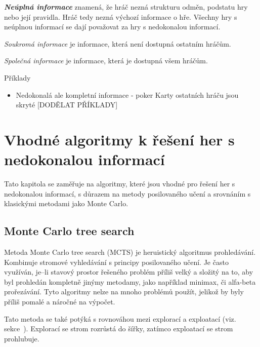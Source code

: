 \textbf{\emph{Neúplná informace}} znamená, že hráč nezná strukturu odměn, podstatu hry nebo její pravidla.
Hráč tedy nezná výchozí informace o hře.
Všechny hry s neúplnou informací se dají považovat za hry s nedokonalou informací.

\emph{Soukromá informace} je informace, která není dostupná ostatním hráčům.

\emph{Společná informace} je informace, která je dostupná všem hráčům.

Příklady
\begin{itemize}
  \item Nedokonalá ale kompletní informace - poker
    Karty ostatních hráču jsou skryté
    {\color {red} [DODĚLAT PŘÍKLADY]}


\end{itemize}


\section{Vhodné algoritmy k řešení her s nedokonalou informací}\label{sec:vhodne-algoritmy-k-reseni-her-s-nedokonalou-informaci}

Tato kapitola se zaměřuje na algoritmy, které jsou vhodné pro řešení her s nedokonalou informací, s důrazem na metody posilovaného učení a srovnáním s klasickými metodami jako Monte Carlo.

\subsection{Monte Carlo tree search}\label{subsec:monte-carlo-tree-search}
Metoda Monte Carlo tree search (MCTS) je heruistický algoritmus prohledávání.
Kombinuje stromové vyhledávání s principy posilovaného učení.
Je často využíván, je--li stavový prostor řešeného problém příliš velký a složitý na to, aby byl prohledán kompletně jinýmy metodamy, jako například minimax, či alfa-beta prořezávání.
Tyto  algoritmy nelze na mnoho problémů použít, jelikož by byly příliš pomalé a náročné na výpočet.

Tato metoda se také potýká s rovnováhou mezi explorací a exploatací (viz.~ sekce~).
Explorací se strom rozrůstá do šířky, zatímco exploatací se strom prohlubuje.

